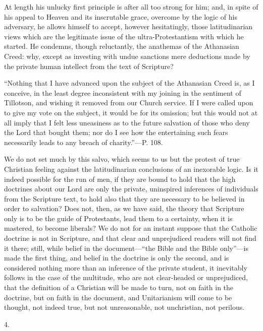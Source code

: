 At length his unlucky first principle is after
all too strong for him; and, in spite of his appeal to Heaven and its
inscrutable grace, overcome by the logic of his adversary, he allows
himself to accept, however hesitatingly, those latitudinarian views
which are the legitimate issue of the ultra-Protestantism with which
he started. He condemns, though reluctantly, the anathemas of
the Athanasian Creed: why, except as investing with undue sanctions
mere deductions made by the private human intellect from the text of
Scripture?

``Nothing
that I have advanced upon the subject of the Athanasian Creed is, as I
conceive, in the least degree inconsistent with my joining in the
sentiment of Tillotson, and wishing it removed from our Church
service. If I were called upon to give my vote on the subject, it
would be for its omission; but this would not at all imply that I felt
less uneasiness as to the future salvation of those who deny the Lord
that bought them; nor do I see how the entertaining such fears
necessarily leads to any breach of charity.''—P. 108.

We do not set much by this salvo, which seems to
us but the protest of true Christian feeling against the
latitudinarian conclusions of an inexorable logic. Is it indeed
possible for the run of men, if they are bound to hold that the high
doctrines about our Lord are only the private, uninspired inferences
of individuals from the Scripture text, to hold also that they are
necessary to be believed in order to salvation? Does not, then, as we
have said, the theory that Scripture only is to be the guide of
Protestants, lead them to a certainty, when it is mastered, to become
liberals? We do not for an instant suppose that the Catholic doctrine
is not in Scripture, and that clear and unprejudiced readers will not
find it there; still, while belief in the document—``the Bible and
the Bible only''—is made the first thing, and belief in the doctrine
is only the second, and is considered nothing more than an inference
of the private student, it inevitably follows in the case of the
multitude, who are not clear-headed or unprejudiced, that the
definition of a Christian will be made to turn, not on faith in the
doctrine, but on faith in the document, and Unitarianism will come to
be thought, not indeed true, but not unreasonable, not unchristian,
not perilous.

4.

